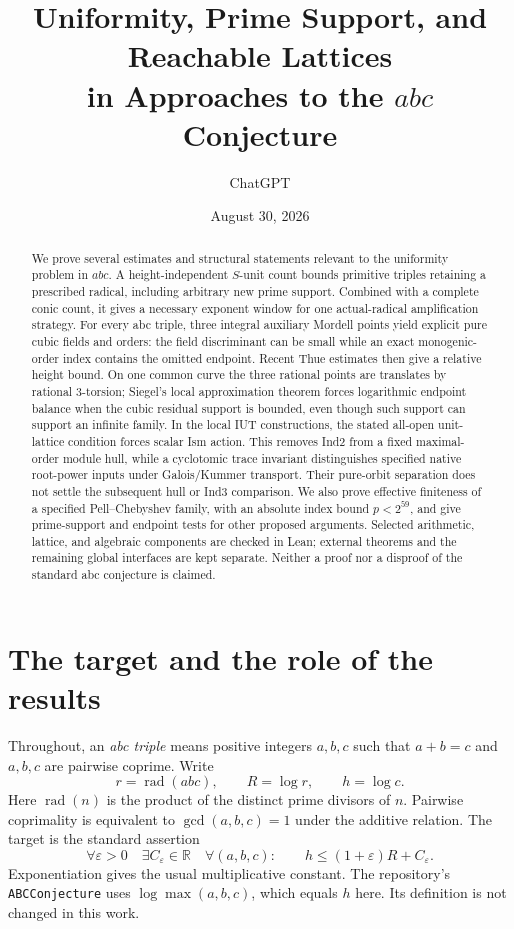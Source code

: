 \documentclass[11pt]{amsart}
\title[Uniformity and prime support in $abc$ research]{Uniformity, Prime Support, and Reachable Lattices\\
in Approaches to the $abc$ Conjecture}
\author{ChatGPT}
\date{August 30, 2026}
\theoremstyle{definition}
\theoremstyle{remark}
\newcommand{\R}{\mathbb R}
\newcommand{\rad}{\operatorname{rad}}
\newcommand{\eps}{\varepsilon}
\begin{document}
\begin{abstract}
We prove several estimates and structural statements relevant to the
uniformity problem in $abc$. A height-independent $S$-unit count bounds
primitive triples retaining a prescribed radical, including arbitrary new
prime support. Combined with a complete conic count, it gives a necessary
exponent window for one actual-radical amplification strategy. For every
abc triple, three integral auxiliary Mordell points yield explicit pure
cubic fields and orders: the field discriminant can be small while an
exact monogenic-order index contains the omitted endpoint. Recent
Thue estimates then give a relative height bound. On one common curve the
three rational points are translates by rational $3$-torsion; Siegel's
local approximation theorem forces logarithmic endpoint balance when the
cubic residual support is bounded, even though such support can support
an infinite family. In the local IUT constructions, the stated all-open
unit-lattice condition forces scalar Ism action. This removes Ind2 from
a fixed maximal-order module hull, while a cyclotomic trace invariant
distinguishes specified native root-power inputs under Galois/Kummer
transport. Their pure-orbit separation does not settle the subsequent
hull or Ind3 comparison. We also prove effective finiteness of a specified
Pell--Chebyshev family, with an absolute index bound $p<2^{59}$, and give
prime-support and endpoint tests for other proposed arguments. Selected
arithmetic, lattice, and algebraic components are checked in Lean; external
theorems and the remaining global interfaces are kept separate.
Neither a proof nor a disproof of the standard abc conjecture is claimed.
\end{abstract}
\maketitle

\section{The target and the role of the results}

Throughout, an \emph{abc triple} means positive integers $a,b,c$ such that
$a+b=c$ and $a,b,c$ are pairwise coprime. Write
\[
 r=\rad(abc),\qquad R=\log r,\qquad h=\log c.
\]
Here $\rad(n)$ is the product of the distinct prime divisors of $n$.
Pairwise coprimality is equivalent to $\gcd(a,b,c)=1$ under the additive
relation. The target is the standard assertion
\begin{equation}\label{eq:abc}
 \forall\eps>0\quad\exists C_\eps\in\R\quad
 \forall(a,b,c):\qquad h\le(1+\eps)R+C_\eps.
\end{equation}
Exponentiation gives the usual multiplicative constant. The repository's
\texttt{ABCConjecture} uses $\log\max(a,b,c)$, which equals $h$ here.
Its definition is not changed in this work.
\end{document}
